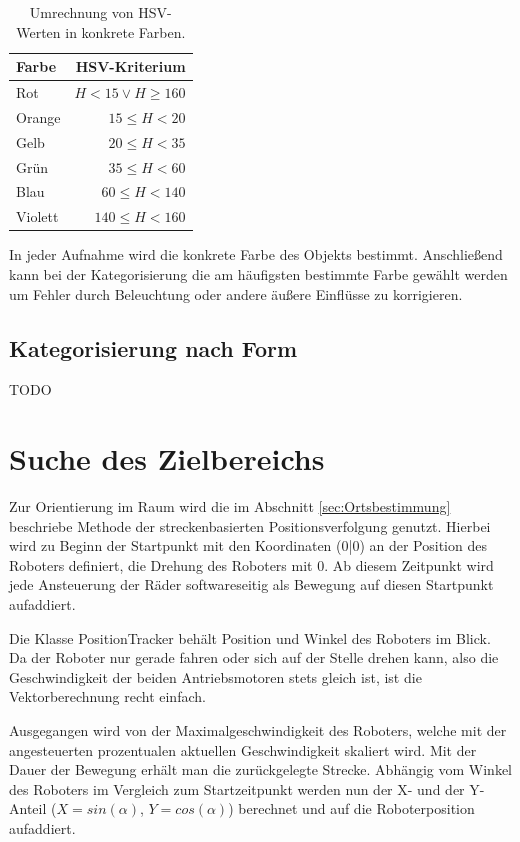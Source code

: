 \begin{table}
	\centering
	\begin{tabular}{lr}
		\toprule
		Farbe & HSV-Kriterium\\
		\midrule
		Rot & $H < 15\vee H \geq 160$ \\
		Orange & $15 \leq H < 20$ \\
		Gelb & $20 \leq H < 35$ \\
		Grün & $35 \leq H < 60$ \\
		Blau & $60 \leq H < 140$ \\
		Violett & $140 \leq H < 160$ \\
												
		\bottomrule
	\end{tabular}
	\caption{Umrechnung von HSV-Werten in konkrete Farben.}
	\label{tab:Farbtabelle}
\end{table}

In jeder Aufnahme wird die konkrete Farbe des Objekts bestimmt. Anschließend kann bei der Kategorisierung die am häufigsten bestimmte Farbe gewählt werden um Fehler durch Beleuchtung oder andere äußere Einflüsse zu korrigieren.

\subsection{Kategorisierung nach Form}
TODO

\section{Suche des Zielbereichs}
\label{sec:Orientierung}

Zur Orientierung im Raum wird die im Abschnitt \ref{sec:Ortsbestimmung} beschriebe Methode der streckenbasierten Positionsverfolgung genutzt. Hierbei wird zu Beginn der Startpunkt mit den Koordinaten (0|0) an der Position des Roboters definiert, die Drehung des Roboters mit 0\degree. Ab diesem Zeitpunkt wird jede Ansteuerung der Räder  softwareseitig als Bewegung auf diesen Startpunkt aufaddiert. 

Die Klasse PositionTracker behält Position und Winkel des Roboters im Blick. Da der Roboter nur gerade fahren oder sich auf der Stelle drehen kann, also die Geschwindigkeit der beiden Antriebsmotoren stets gleich ist, ist die Vektorberechnung recht einfach.

Ausgegangen wird von der Maximalgeschwindigkeit des Roboters, welche mit der angesteuerten prozentualen aktuellen Geschwindigkeit skaliert wird. Mit der Dauer der Bewegung erhält man die zurückgelegte Strecke. Abhängig vom Winkel des Roboters im Vergleich zum Startzeitpunkt werden nun der X- und der Y-Anteil ($X=sin(\alpha)$, $Y=cos(\alpha)$) berechnet und auf die Roboterposition aufaddiert.

